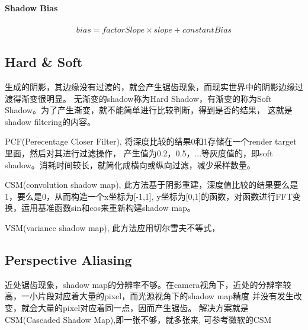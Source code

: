 \paragraph{Shadow Bias}

\begin{gather*}
    bias = factorSlope \times slope + constantBias
\end{gather*}

\subsection{Hard \& Soft}

生成的阴影，其边缘没有过渡的，就会产生锯齿现象，而现实世界中的阴影边缘过渡得渐变很明显。
无渐变的shadow称为Hard Shadow，有渐变的称为Soft Shadow。为了产生渐变，就不能简单进行比较判断，得到是否的结果，
这就是shadow filtering的内容。

PCF(Perecentage Closer Filter), 将深度比较的结果0和1存储在一个render target里面，然后对其进行过滤操作，
产生值为0.2，0.5，...等灰度值的，即soft shadow。消耗时间较长，就简化成横向或纵向过滤，减少采样数量。

CSM(convolution shadow map), 此方法基于阴影重建，深度值比较的结果要么是1，要么是0，从而构造一个x坐标为[-1,1],
y坐标为[0,1]的函数，对函数进行FFT变换，运用基准函数sin和cos来重新构建shadow map。 

VSM(variance shadow map), 此方法应用切尔雪夫不等式，

\subsection{Perspective Aliasing}

近处锯齿现象，shadow map的分辨率不够。在camera视角下，近处的分辨率较高，一小片段对应着大量的pixel，而光源视角下的shadow map精度
并没有发生改变，就会大量的pixel对应着同一点，因而产生锯齿。 解决方案就是CSM(Cascaded Shadow Map),即一张不够，就多张来,
可参考微软的CSM\cite{CSM-msdn}
